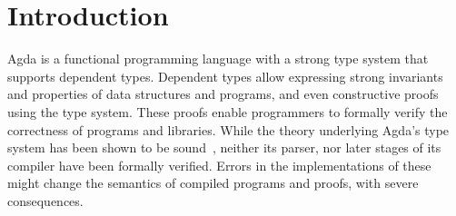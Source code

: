 \chapter{Introduction}


%

	Agda is a functional programming language with a strong type system that
	supports dependent types. Dependent types allow expressing strong
	invariants and properties of data structures and programs, and even
	constructive proofs using the type system. These proofs enable programmers
	to formally verify the correctness of programs and libraries. While the
	theory underlying Agda's type system has been shown to be sound~\cite{?},
	neither its parser, nor later stages of its compiler have been formally
	verified. Errors in the implementations of these might change the semantics
	of compiled programs and proofs, with severe consequences.

